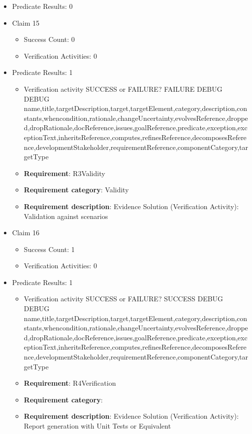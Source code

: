 \documentclass{article}
\begin{document}
\begin{itemize}
\begin{itemize}
				\end{itemize}
				
									    
				\item Predicate Results: 0

  				  \item Claim 15
				\begin{itemize}
			    	\item Success Count: 0 
			    	\item Verification Activities: 0
				\end{itemize}
				
									    
				\item Predicate Results: 1
					\begin{itemize}				
					\item Verification activity SUCCESS or FAILURE? FAILURE
					DEBUG DEBUG name,title,targetDescription,target,targetElement,category,description,constants,whencondition,rationale,changeUncertainty,evolvesReference,dropped,dropRationale,docReference,issues,goalReference,predicate,exception,exceptionText,inheritsReference,computes,refinesReference,decomposesReference,developmentStakeholder,requirementReference,componentCategory,targetType
					\item \textbf{Requirement}: R3Validity 
					\item \textbf{Requirement category}: Validity
					\item \textbf{Requirement description}: Evidence Solution (Verification Activity): Validation against scenarios
					\end{itemize}

  				  \item Claim 16
				\begin{itemize}
			    	\item Success Count: 1 
			    	\item Verification Activities: 0
				\end{itemize}
				
									    
				\item Predicate Results: 1
					\begin{itemize}				
					\item Verification activity SUCCESS or FAILURE? SUCCESS
					DEBUG DEBUG name,title,targetDescription,target,targetElement,category,description,constants,whencondition,rationale,changeUncertainty,evolvesReference,dropped,dropRationale,docReference,issues,goalReference,predicate,exception,exceptionText,inheritsReference,computes,refinesReference,decomposesReference,developmentStakeholder,requirementReference,componentCategory,targetType
					\item \textbf{Requirement}: R4Verification 
					\item \textbf{Requirement category}: 
					\item \textbf{Requirement description}: Evidence Solution (Verification Activity): Report generation with Unit Tests or Equivalent
					\end{itemize}


\end{itemize}
\end{document}
